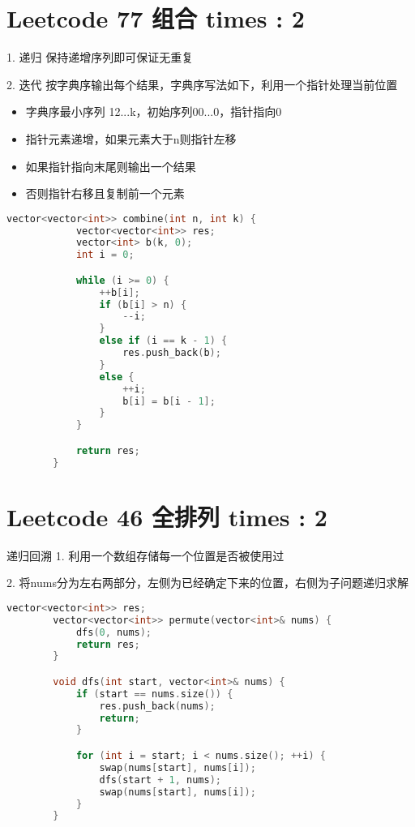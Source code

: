 \documentclass[UTF8]{ctexart}
\begin{document}
\section{Leetcode 77 组合 times : 2}
1. 递归 保持递增序列即可保证无重复

2. 迭代 按字典序输出每个结果，字典序写法如下，利用一个指针处理当前位置
\begin{itemize}
	\item 字典序最小序列 12...k，初始序列00...0，指针指向0
	\item 指针元素递增，如果元素大于n则指针左移
	\item 如果指针指向末尾则输出一个结果
	\item 否则指针右移且复制前一个元素
\end{itemize}

\begin{framed}
	\begin{lstlisting}[language=C++]
		vector<vector<int>> combine(int n, int k) {
			vector<vector<int>> res;
			vector<int> b(k, 0);
			int i = 0;

			while (i >= 0) {
				++b[i];
				if (b[i] > n) {
					--i;
				}
				else if (i == k - 1) {
					res.push_back(b);
				}
				else {
					++i;
					b[i] = b[i - 1];
				}
			}

			return res;
		}
	\end{lstlisting}
\end{framed}

\section{Leetcode 46 全排列 times : 2}
递归回溯
1. 利用一个数组存储每一个位置是否被使用过

2. 将nums分为左右两部分，左侧为已经确定下来的位置，右侧为子问题递归求解
\begin{framed}
	\begin{lstlisting}[language=C++]
		vector<vector<int>> res;
		vector<vector<int>> permute(vector<int>& nums) {
			dfs(0, nums);
			return res;
		}

		void dfs(int start, vector<int>& nums) {
			if (start == nums.size()) {
				res.push_back(nums);
				return;
			}

			for (int i = start; i < nums.size(); ++i) {
				swap(nums[start], nums[i]);
				dfs(start + 1, nums);
				swap(nums[start], nums[i]);
			}
		}
	\end{lstlisting}
\end{framed}
\end{document}
